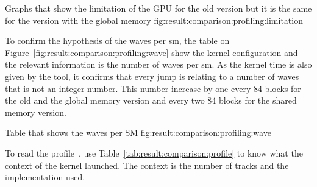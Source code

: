 {Graphs that show the limitation of the GPU for the old version but it is the
same for the version with the global memory}
{fig:result:comparison:profiling:limitation}

To confirm the hypothesis of the waves per \acrshort{sm}, the table on
Figure~\ref{fig:result:comparison:profiling:wave} show the kernel configuration
and the relevant information is the number of waves per \acrshort{sm}.
As the kernel time is also given by the tool, it confirms that every jump is
relating to a number of waves that is not an integer number.
This number increase by one every 84 blocks for the old and the global memory
version and every two 84 blocks for the shared memory version.

{Table that shows the waves per SM}
{fig:result:comparison:profiling:wave}

To read the profile~\cite{nsight-profile}, use Table~\ref{tab:result:comparison:profile} to know
what the context of the kernel launched.
The context is the number of tracks and the implementation used.


